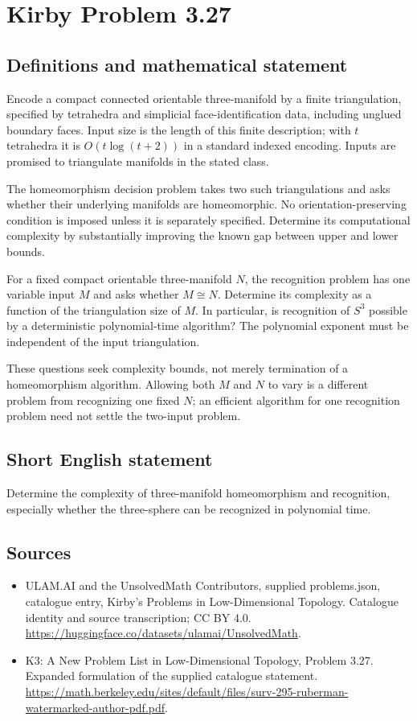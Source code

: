 \documentclass[11pt,a4paper]{article}
\begin{document}
\section*{Kirby Problem 3.27}\label{statement}

\subsection{Definitions and mathematical statement}
Encode a compact connected orientable three-manifold by a finite triangulation,
specified by tetrahedra and simplicial face-identification data, including
unglued boundary faces. Input size is the length of this finite description;
with $t$ tetrahedra it is $O(t\log(t+2))$ in a standard indexed encoding.
Inputs are promised to triangulate manifolds in the stated class.

The homeomorphism decision problem takes two such triangulations and asks
whether their underlying manifolds are homeomorphic. No orientation-preserving
condition is imposed unless it is separately specified. Determine its
computational complexity by substantially improving the known gap between
upper and lower bounds.

For a fixed compact orientable three-manifold $N$, the recognition problem
has one variable input $M$ and asks whether $M\cong N$. Determine its
complexity as a function of the triangulation size of $M$. In particular,
is recognition of $S^3$ possible by a deterministic polynomial-time algorithm?
The polynomial exponent must be independent of the input triangulation.

These questions seek complexity bounds, not merely termination of a
homeomorphism algorithm. Allowing both $M$ and $N$ to vary is a different
problem from recognizing one fixed $N$; an efficient algorithm for one
recognition problem need not settle the two-input problem.
\subsection{Short English statement}
Determine the complexity of three-manifold homeomorphism and recognition, especially whether the three-sphere can be recognized in polynomial time.
\subsection{Sources}
\begin{itemize}
\item[S1] ULAM.AI and the UnsolvedMath Contributors, supplied problems.json, catalogue entry, Kirby's Problems in Low-Dimensional Topology. Catalogue identity and source transcription; CC BY 4.0.
\url{https://huggingface.co/datasets/ulamai/UnsolvedMath}.
\item[S2] K3: A New Problem List in Low-Dimensional Topology, Problem 3.27. Expanded formulation of the supplied catalogue statement.
\url{https://math.berkeley.edu/sites/default/files/surv-295-ruberman-watermarked-author-pdf.pdf}.
\end{itemize}
\end{document}
